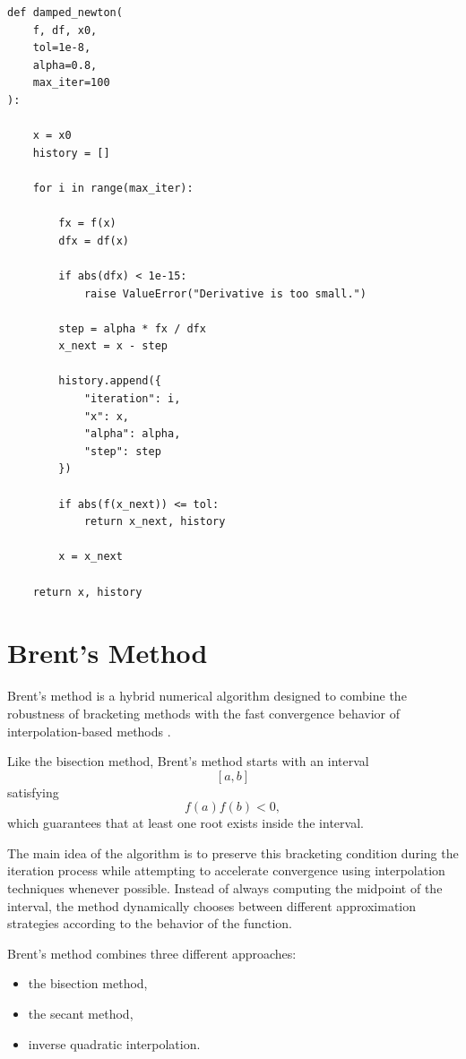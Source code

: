 \begin{lstlisting}
def damped_newton(
    f, df, x0,
    tol=1e-8,
    alpha=0.8,
    max_iter=100
):

    x = x0
    history = []

    for i in range(max_iter):

        fx = f(x)
        dfx = df(x)

        if abs(dfx) < 1e-15:
            raise ValueError("Derivative is too small.")

        step = alpha * fx / dfx
        x_next = x - step

        history.append({
            "iteration": i,
            "x": x,
            "alpha": alpha,
            "step": step
        })

        if abs(f(x_next)) <= tol:
            return x_next, history

        x = x_next

    return x, history
\end{lstlisting}

\section{Brent's Method}

Brent's method is a hybrid numerical algorithm designed to combine the robustness of bracketing methods with the fast convergence behavior of interpolation-based methods \cite{atkinson, chapra}.

Like the bisection method, Brent's method starts with an interval
\[
[a,b]
\]
satisfying
\[
f(a)f(b)<0,
\]
which guarantees that at least one root exists inside the interval.

The main idea of the algorithm is to preserve this bracketing condition during the iteration process while attempting to accelerate convergence using interpolation techniques whenever possible. Instead of always computing the midpoint of the interval, the method dynamically chooses between different approximation strategies according to the behavior of the function.

Brent's method combines three different approaches:

\begin{itemize}
    \item the bisection method,
    \item the secant method,
    \item inverse quadratic interpolation.
\end{itemize}

